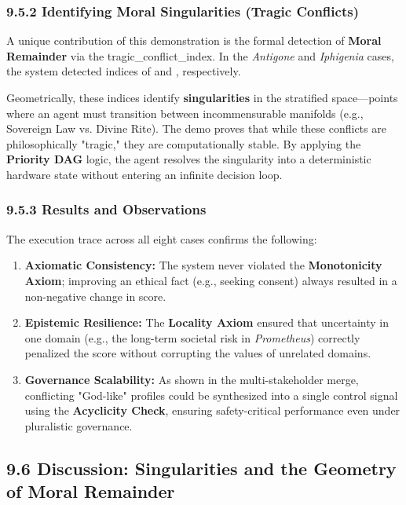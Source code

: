 \documentclass[12pt]{article}
\theoremstyle{plain}
\theoremstyle{definition}
\theoremstyle{remark}
\begin{document}
\subsubsection{9.5.2 Identifying Moral Singularities (Tragic
Conflicts)}\label{identifying-moral-singularities-tragic-conflicts}

A unique contribution of this demonstration is the formal detection of
\textbf{Moral Remainder} via the tragic\_conflict\_index. In the
\emph{Antigone} and \emph{Iphigenia} cases, the system detected indices
of and , respectively.

Geometrically, these indices identify \textbf{singularities} in the
stratified space---points where an agent must transition between
incommensurable manifolds (e.g., Sovereign Law vs. Divine Rite). The
demo proves that while these conflicts are philosophically "tragic,"
they are computationally stable. By applying the \textbf{Priority DAG}
logic, the agent resolves the singularity into a deterministic hardware
state without entering an infinite decision loop.

\subsubsection{9.5.3 Results and
Observations}\label{results-and-observations}

The execution trace across all eight cases confirms the following:

\begin{enumerate}
\item
  \textbf{Axiomatic Consistency:} The system never violated the
  \textbf{Monotonicity Axiom}; improving an ethical fact (e.g., seeking
  consent) always resulted in a non-negative change in score.
\item
  \textbf{Epistemic Resilience:} The \textbf{Locality Axiom} ensured
  that uncertainty in one domain (e.g., the long-term societal risk in
  \emph{Prometheus}) correctly penalized the score without corrupting
  the values of unrelated domains.
\item
  \textbf{Governance Scalability:} As shown in the multi-stakeholder
  merge, conflicting "God-like" profiles could be synthesized into a
  single control signal using the \textbf{Acyclicity Check}, ensuring
  safety-critical performance even under pluralistic governance.
\end{enumerate}

\subsection{9.6 Discussion: Singularities and the Geometry of Moral
Remainder}\label{discussion-singularities-and-the-geometry-of-moral-remainder}
\end{document}
